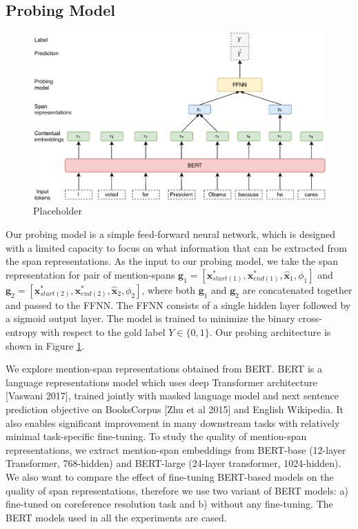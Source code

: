 \documentclass[11pt]{article}
\begin{document}
\subsection{Probing Model}

\begin{figure}[ht]
  \includegraphics[width=\textwidth]{probing_model}
  \caption{Placeholder}
  \label{fig:probing_model}
\end{figure}

Our probing model is a simple feed-forward neural network, which is designed with a limited capacity to focus on what information that can be extracted from the span representations.
As the input to our probing model, we take the span representation for pair of mention-spans $\pmb{g}_{1} = [\pmb{x}_{start(1)}^{*}, \pmb{x}_{end(1)}^{*}, \hat{\pmb{x}}_{1}, \phi_{1}]$ and $\pmb{g}_{2} = [\pmb{x}_{start(2)}^{*}, \pmb{x}_{end(2)}^{*}, \hat{\pmb{x}}_{2}, \phi_{2}]$, where both $\pmb{g}_{1}$ and $\pmb{g}_{2}$ are concatenated together and passed to the FFNN. The FFNN consists of a single hidden layer followed by a sigmoid output layer. The model is trained to minimize the binary cross-entropy with respect to the gold label $Y \in \{0,1\}$. Our probing architecture is shown in Figure \ref{fig:probing_model}.
\pagebreak

We explore mention-span representations obtained from BERT. BERT \parencite{devlin2019bert} is a language representations model which uses deep Transformer architecture [Vaswani 2017], trained jointly with masked language model and next sentence prediction objective on BooksCorpus [Zhu et al 2015] and English Wikipedia. It also enables significant improvement in many downstream tasks with relatively minimal task-specific fine-tuning. To study the quality of mention-span representations, we extract mention-span embeddings from BERT-base (12-layer Transformer, 768-hidden) and BERT-large (24-layer transformer, 1024-hidden). We also want to compare the effect of fine-tuning BERT-based models on the quality of span representations, therefore we use two variant of BERT models: a) fine-tuned on coreference resolution task and b) without any fine-tuning. The BERT models used in all the experiments are cased.
\end{document}
